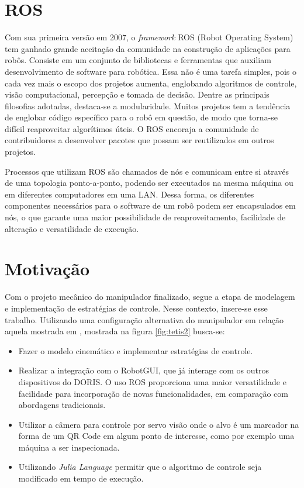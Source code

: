 \section{ROS}
Com sua primeira versão em 2007, o \textit{framework} ROS (Robot Operating System) tem ganhado grande aceitação da comunidade na construção de aplicações para robôs. Consiste em um conjunto de bibliotecas e ferramentas que auxiliam desenvolvimento de software para robótica. Essa não é uma tarefa simples, pois o cada vez mais o escopo dos projetos aumenta, englobando algoritmos de controle, visão computacional, percepção e tomada de decisão.
Dentre as principais filosofias adotadas, destaca-se a modularidade. 
Muitos projetos tem a tendência de englobar código específico para o robô em questão, de modo que torna-se difícil reaproveitar algorítimos úteis. O ROS encoraja a comunidade de contribuidores a desenvolver pacotes que possam ser reutilizados em outros projetos.  

Processos que utilizam ROS são chamados de nós e comunicam entre si através de uma topologia ponto-a-ponto, podendo ser executados na mesma máquina ou em diferentes computadores em uma LAN. Dessa forma, os diferentes componentes necessários para o software de um robô podem ser encapsulados em nós, o que garante uma maior possibilidade de reaproveitamento, facilidade de alteração e versatilidade de execução.

\section{Motivação}
Com o projeto mecânico do manipulador finalizado, segue a etapa de modelagem e implementação de estratégias de controle. 
Nesse contexto, insere-se esse trabalho. Utilizando uma configuração alternativa do manipulador em relação aquela mostrada em \cite{xaud2016}, mostrada na figura \ref{fig:tetis2} busca-se:
\begin{itemize}
\item Fazer o modelo cinemático e implementar estratégias de controle. %

\item Realizar a integração com o RobotGUI, que já interage com os outros dispositivos do DORIS. O uso ROS proporciona uma maior versatilidade e facilidade para incorporação de novas funcionalidades, em comparação com abordagens tradicionais.

\item Utilizar a câmera para controle por servo visão onde o alvo é um marcador na forma de um QR Code em algum ponto de interesse, como por exemplo uma máquina a ser inspecionada. 

\item Utilizando \textit{Julia Language} permitir que o algoritmo de controle seja modificado em tempo de execução.
\end{itemize}


